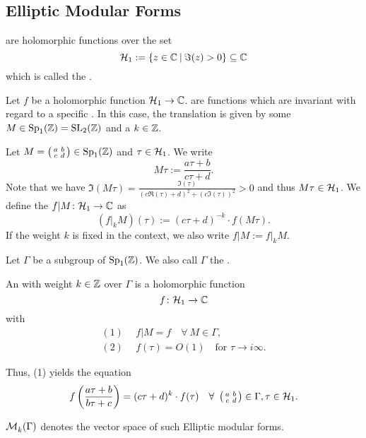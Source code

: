 

\subsection{Elliptic Modular Forms}
 are holomorphic functions over the set
\[ \SiegelHalfPlane_1 := \Set{z \in \C}{\Im(z) > 0} \subseteq \C \]
which is called the .

Let $f$ be a holomorphic function $\mathcal{H}_1 \rightarrow \mathbb{C}$.  are functions which are invariant with regard to a specific . In this case, the translation is given by some $M \in \operatorname{Sp}_1(\mathbb{Z}) = \operatorname{SL}_2(\mathbb{Z})$ and a  $k \in \mathbb{Z}$.

Let $M = \left( \begin{smallmatrix} a & b \\ c & d \end{smallmatrix} \right) \in \operatorname{Sp}_1(\mathbb{Z})$ and $\tau \in \mathcal{H}_1$. We write
\[ M \tau := \frac{a \tau + b}{c \tau + d} . \]
Note that we have $\Im(M\tau) = \frac{\Im(\tau)}{(c\Re(\tau)+d)^2 + (c \Im(\tau))^2} > 0$ and thus $M \tau \in \mathcal{H}_1$.
We define the  $f | M \colon \mathcal{H}_1 \rightarrow \mathbb{C}$ as
\[ (f |_k M) (\tau) :=  (c \tau + d)^{-k} \cdot f(M \tau) . \]
If the weight $k$ is fixed in the context, we also write $f | M := f |_k M$.

Let $\Gamma$ be a subgroup of $\operatorname{Sp}_1(\mathbb{Z})$. We also call $\Gamma$ the .

An  with weight $k \in \mathbb{Z}$ over $\Gamma$ is a holomorphic function
\[ f \colon \mathcal{H}_1 \rightarrow \mathbb{C} \]
with
\begin{align*}
(1) \ \ & f | M  = f \quad \forall \ M \in \Gamma, \\
(2) \ \ & f(\tau) = O(1) \quad \text{for } \tau \rightarrow i \infty .
\end{align*}

Thus, (1) yields the equation
\[ f\left(\frac{a \tau + b}{b \tau + c}\right) = (c \tau + d)^k \cdot f(\tau) \quad \forall \ \left( \begin{smallmatrix} a & b \\ c & d \end{smallmatrix} \right) \in \Gamma, \tau \in \mathcal{H}_1 . \]

$\operatorname{\mathcal{M}}^{}_{k} (\Gamma)$ denotes the vector space of such Elliptic modular forms.

